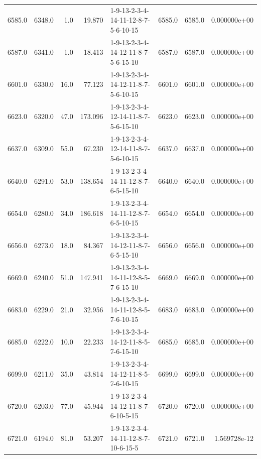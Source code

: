 \begin{tabular}{rrrrlrrr}
 6585.0 &  6348.0 &            1.0 &             19.870 &  1-9-13-2-3-4-14-11-12-8-7-5-6-10-15 &        6585.0 &          6585.0 &  0.000000e+00 \\
 6587.0 &  6341.0 &            1.0 &             18.413 &  1-9-13-2-3-4-14-12-11-8-7-5-6-15-10 &        6587.0 &          6587.0 &  0.000000e+00 \\
 6601.0 &  6330.0 &           16.0 &             77.123 &  1-9-13-2-3-4-14-12-11-8-7-5-6-10-15 &        6601.0 &          6601.0 &  0.000000e+00 \\
 6623.0 &  6320.0 &           47.0 &            173.096 &  1-9-13-2-3-4-12-14-11-8-7-5-6-15-10 &        6623.0 &          6623.0 &  0.000000e+00 \\
 6637.0 &  6309.0 &           55.0 &             67.230 &  1-9-13-2-3-4-12-14-11-8-7-5-6-10-15 &        6637.0 &          6637.0 &  0.000000e+00 \\
 6640.0 &  6291.0 &           53.0 &            138.654 &  1-9-13-2-3-4-14-11-12-8-7-6-5-15-10 &        6640.0 &          6640.0 &  0.000000e+00 \\
 6654.0 &  6280.0 &           34.0 &            186.618 &  1-9-13-2-3-4-14-11-12-8-7-6-5-10-15 &        6654.0 &          6654.0 &  0.000000e+00 \\
 6656.0 &  6273.0 &           18.0 &             84.367 &  1-9-13-2-3-4-14-12-11-8-7-6-5-15-10 &        6656.0 &          6656.0 &  0.000000e+00 \\
 6669.0 &  6240.0 &           51.0 &            147.941 &  1-9-13-2-3-4-14-11-12-8-5-7-6-15-10 &        6669.0 &          6669.0 &  0.000000e+00 \\
 6683.0 &  6229.0 &           21.0 &             32.956 &  1-9-13-2-3-4-14-11-12-8-5-7-6-10-15 &        6683.0 &          6683.0 &  0.000000e+00 \\
 6685.0 &  6222.0 &           10.0 &             22.233 &  1-9-13-2-3-4-14-12-11-8-5-7-6-15-10 &        6685.0 &          6685.0 &  0.000000e+00 \\
 6699.0 &  6211.0 &           35.0 &             43.814 &  1-9-13-2-3-4-14-12-11-8-5-7-6-10-15 &        6699.0 &          6699.0 &  0.000000e+00 \\
 6720.0 &  6203.0 &           77.0 &             45.944 &  1-9-13-2-3-4-14-12-11-8-7-6-10-5-15 &        6720.0 &          6720.0 &  0.000000e+00 \\
 6721.0 &  6194.0 &           81.0 &             53.207 &  1-9-13-2-3-4-14-11-12-8-7-10-6-15-5 &        6721.0 &          6721.0 &  1.569728e-12 \\

\end{tabular}
